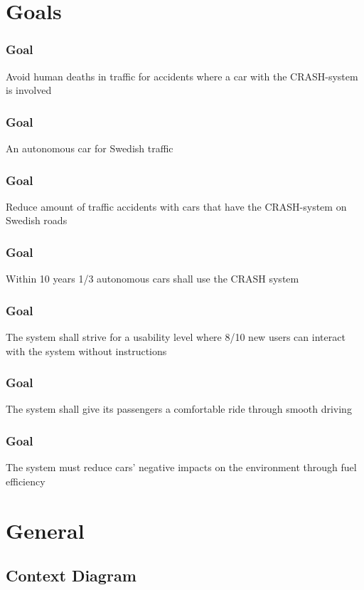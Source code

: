\documentclass{article}
\begin{document}
\section{Goals}
    \subsubsection{Goal}
\hfill \break 
\- \- \-Avoid human deaths in traffic for accidents where a car with the CRASH-system is involved
    \subsubsection{Goal}
\hfill \break 
\- \- \-An autonomous car for Swedish traffic
    \subsubsection{Goal}
\hfill \break 
\- \- \-Reduce amount of traffic accidents with cars that have the CRASH-system on Swedish roads
    \subsubsection{Goal}
\hfill \break 
\- \- \-Within 10 years 1/3 autonomous cars shall use the CRASH system
    \subsubsection{Goal}
\hfill \break 
\- \- \-The system shall strive for a usability level where 8/10 new users can interact with the system without instructions
    \subsubsection{Goal}
\hfill \break 
\- \- \-The system shall give its passengers a comfortable ride through smooth driving
    \subsubsection{Goal}
\hfill \break 
\- \- \-The system must reduce cars' negative impacts on the environment through fuel efficiency

\section{General}
\subsection{Context Diagram}
\end{document}
